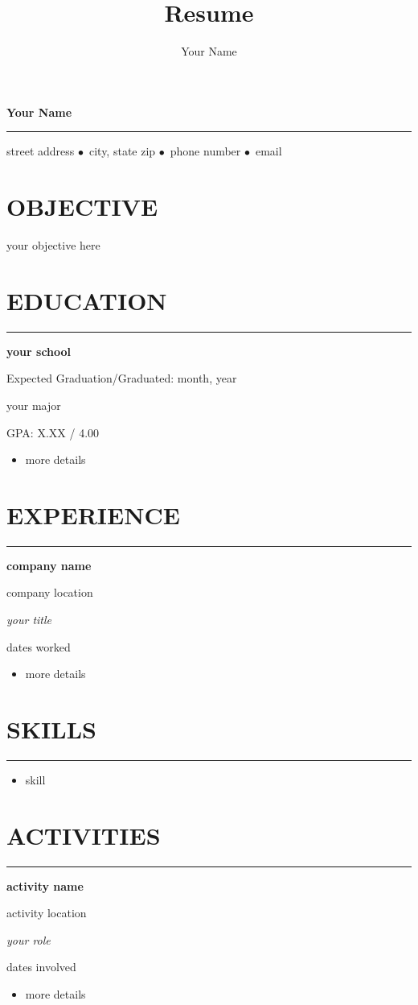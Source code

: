 \documentclass[10pt,letterpaper]{article}
\title{Resume}
\author{Your Name}
\date{}
\newcommand{\objectivewidth}{0.18\textwidth}%
\newcommand{\GapOne}{12pt}%
\newcommand{\GapTwo}{6pt}%
\newcommand{\bt}{$\bullet$}
\newcommand{\sect}[1]%
	{
	\section{{#1}}
	\hrule
	}
\newcommand{\sectlist}[1]%
	{
	\section{{#1}}
	\hrule
	\vspace{\GapTwo}%
	}
\newcommand{\school}[4]%
	{
	\vspace{\GapTwo}%
	\begin{minipage}{0.5\textwidth}
		\begin{flushleft}
			\textbf{{#1}}%
		\end{flushleft}
	\end{minipage}
	\hfill
	\begin{minipage}{0.5\textwidth}
		\begin{flushright}
			{#3}%
		\end{flushright}
	\end{minipage}
	
	\begin{minipage}{0.5\textwidth}
		\begin{flushleft}
			{#2}%
		\end{flushleft}
	\end{minipage}
	\hfill
	\begin{minipage}{0.5\textwidth}
		\begin{flushright}
			{#4}%
		\end{flushright}
	\end{minipage}
	}
\newcommand{\entry}[4]%
	{
	\vspace{\GapTwo}%
	\begin{minipage}{0.5\textwidth}
		\begin{flushleft}
			\textbf{{#1}}%
		\end{flushleft}
	\end{minipage}
	\hfill
	\begin{minipage}{0.5\textwidth}
		\begin{flushright}
			{#3}%
		\end{flushright}
	\end{minipage}
	
	\begin{minipage}{0.5\textwidth}
		\begin{flushleft}
			\textit{#2}%
		\end{flushleft}
	\end{minipage}
	\hfill
	\begin{minipage}{0.5\textwidth}
		\begin{flushright}
			{#4}%
		\end{flushright}
	\end{minipage}
	}
\begin{document}
\begin{center}
\huge \textbf{Your Name}%
\end{center}
\hrule
\vspace{3pt}
\begin{center}
\normalsize street address \bt\ city, state zip \bt\ phone number \bt\ email%
\end{center}


\begin{minipage}{\objectivewidth}
	\section{OBJECTIVE}
\end{minipage}
\hfill
\begin{minipage}{\textwidth - \objectivewidth}
	\vspace{\GapOne}
	your objective here
	\vspace{\GapOne}
\end{minipage}


\sect{EDUCATION}

\school{your school}
{your major}
{Expected Graduation/Graduated: month, year}
{GPA: X.XX / 4.00}
\begin{itemize}
\item more details
\end{itemize}


\sect{EXPERIENCE}

\entry{company name}
{your title}
{company location}
{dates worked}
\begin{itemize}
\item more details
\end{itemize}


\sectlist{SKILLS}

\begin{itemize}
\item skill
\end{itemize}


\sect{ACTIVITIES}

\entry{activity name}
{your role}
{activity location}
{dates involved}
\begin{itemize}
\item more details
\end{itemize}
\end{document}
